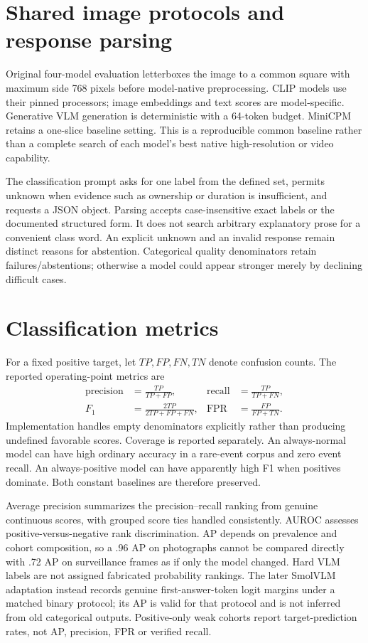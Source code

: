 \section{Shared image protocols and response parsing}
Original four-model evaluation letterboxes the image to a common square with maximum side 768 pixels before model-native preprocessing. CLIP models use their pinned processors; image embeddings and text scores are model-specific. Generative VLM generation is deterministic with a 64-token budget. MiniCPM retains a one-slice baseline setting. This is a reproducible common baseline rather than a complete search of each model's best native high-resolution or video capability.

The classification prompt asks for one label from the defined set, permits unknown when evidence such as ownership or duration is insufficient, and requests a JSON object. Parsing accepts case-insensitive exact labels or the documented structured form. It does not search arbitrary explanatory prose for a convenient class word. An explicit unknown and an invalid response remain distinct reasons for abstention. Categorical quality denominators retain failures/abstentions; otherwise a model could appear stronger merely by declining difficult cases.

\section{Classification metrics}
For a fixed positive target, let $TP,FP,FN,TN$ denote confusion counts. The reported operating-point metrics are
\begin{align}
\operatorname{precision}&=\frac{TP}{TP+FP}, &
\operatorname{recall}&=\frac{TP}{TP+FN},\\
F_1&=\frac{2TP}{2TP+FP+FN}, &
\operatorname{FPR}&=\frac{FP}{FP+TN}.
\end{align}
Implementation handles empty denominators explicitly rather than producing undefined favorable scores. Coverage is reported separately. An always-normal model can have high ordinary accuracy in a rare-event corpus and zero event recall. An always-positive model can have apparently high F1 when positives dominate. Both constant baselines are therefore preserved.

Average precision summarizes the precision--recall ranking from genuine continuous scores, with grouped score ties handled consistently. AUROC assesses positive-versus-negative rank discrimination. AP depends on prevalence and cohort composition, so a .96 AP on photographs cannot be compared directly with .72 AP on surveillance frames as if only the model changed. Hard VLM labels are not assigned fabricated probability rankings. The later SmolVLM adaptation instead records genuine first-answer-token logit margins under a matched binary protocol; its AP is valid for that protocol and is not inferred from old categorical outputs. Positive-only weak cohorts report target-prediction rates, not AP, precision, FPR or verified recall.

